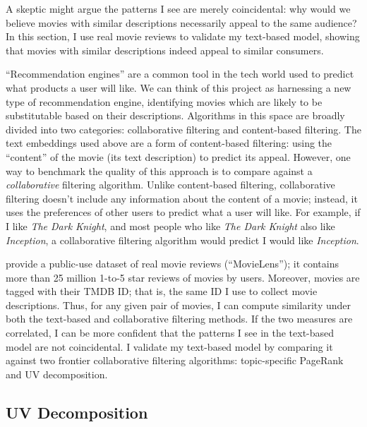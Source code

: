 \documentclass{article}
\begin{document}
A skeptic might argue the patterns I see are merely coincidental: why would we believe movies with similar descriptions necessarily appeal to the same audience? In this section, I use real movie reviews to validate my text-based model, showing that movies with similar descriptions indeed appeal to similar consumers.

``Recommendation engines'' are a common tool in the tech world used to predict what products a user will like. We can think of this project as harnessing a new type of recommendation engine, identifying movies which are likely to be substitutable based on their descriptions. Algorithms in this space are broadly divided into two categories: collaborative filtering and content-based filtering. The text embeddings used above are a form of content-based filtering: using the ``content'' of the movie (its text description) to predict its appeal. However, one way to benchmark the quality of this approach is to compare against a \emph{collaborative} filtering algorithm. Unlike content-based filtering, collaborative filtering doesn't include any information about the content of a movie; instead, it uses the preferences of other users to predict what a user will like. For example, if I like \emph{The Dark Knight}, and most people who like \emph{The Dark Knight} also like \emph{Inception}, a collaborative filtering algorithm would predict I would like \emph{Inception}. 

\textcite{harper2016ATIIS} provide a public-use dataset of real movie reviews (``MovieLens''); it contains more than 25 million 1-to-5 star reviews of movies by users. Moreover, movies are tagged with their TMDB ID; that is, the same ID I use to collect movie descriptions. Thus, for any given pair of movies, I can compute similarity under both the text-based and collaborative filtering methods. If the two measures are correlated, I can be more confident that the patterns I see in the text-based model are not coincidental. I validate my text-based model by comparing it against two frontier collaborative filtering algorithms: topic-specific PageRank and UV decomposition.

\subsection{UV Decomposition}
\end{document}
